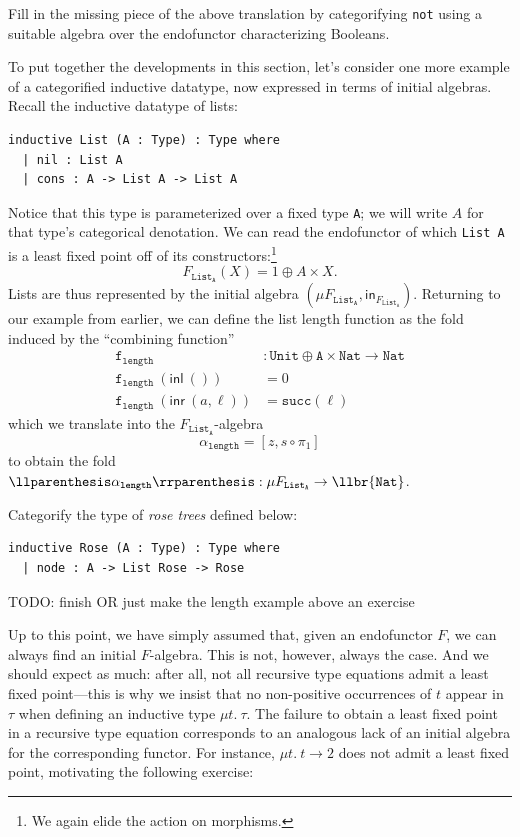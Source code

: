 \begin{exercise}
\sloppy
  Fill in the missing piece of the above translation by categorifying \texttt{not} using a suitable
  algebra over the endofunctor characterizing Booleans.
\end{exercise}

To put together the developments in this section, let's consider one more example of a categorified
inductive datatype, now expressed in terms of initial algebras. Recall the inductive datatype of
lists:

\begin{lstlisting}
inductive List (A : Type) : Type where
  | nil : List A
  | cons : A -> List A -> List A
\end{lstlisting}

Notice that this type is parameterized over a fixed type \texttt{A}; we will write $A$ for that
type's categorical denotation. We can read the endofunctor of which \texttt{List A} is a least fixed
point off of its constructors:\footnote{We again elide the action on morphisms.}
\[ F_\mathtt{List_A}(X) = 1 \oplus A \times X. \]
Lists are thus represented by the initial algebra $(\mu F_{\mathtt{List_A}},
\mathsf{in}_{F_\mathtt{List_A}})$. Returning to our example from earlier, we can define the list
length function as the fold induced by the ``combining function''
\begin{align*}
  \texttt{f}_\texttt{length} &: \texttt{Unit} \oplus \texttt{A} \times \texttt{Nat} \to \texttt{Nat}\\
  \texttt{f}_\texttt{length}~(\mathsf{inl}~()) &= 0\\
  \texttt{f}_\texttt{length}~(\mathsf{inr}~(a, \ell)) &= \texttt{succ}(\ell)
\end{align*}
which we translate into the $F_\mathtt{List_A}$-algebra
\[ \alpha_\texttt{length} = [z, s \circ \pi_1] \]
to obtain the fold $\llpr{\alpha_\texttt{length}} : \mu F_\mathtt{List_A} \to \llbr{\texttt{Nat}}$.

\begin{exercise}
Categorify the type of \emph{rose trees} defined below:
\begin{lstlisting}
inductive Rose (A : Type) : Type where
  | node : A -> List Rose -> Rose
\end{lstlisting}
TODO: finish OR just make the length example above an exercise
\end{exercise}

Up to this point, we have simply assumed that, given an endofunctor $F$, we can always find an
initial $F$-algebra. This is not, however, always the case. And we should expect as much: after all,
not all recursive type equations admit a least fixed point---this is why we insist that no
non-positive occurrences of $t$ appear in $\tau$ when defining an inductive type $\mu t.~\tau$. The
failure to obtain a least fixed point in a recursive type equation corresponds to an analogous lack
of an initial algebra for the corresponding functor. For instance, $\mu t.~t \to 2$ does not admit a
least fixed point, motivating the following exercise:

